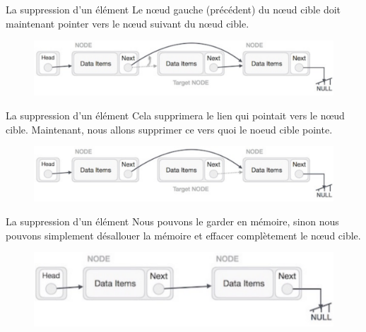 \documentclass[10pt,xcolor=dvipsnames]{beamer}
\begin{document}
\begin{frame}{La suppression d'un élément}
Le nœud gauche (précédent) du nœud cible doit maintenant pointer vers le nœud suivant du nœud cible.
        \begin{figure}
        \centering
        \includegraphics[scale=0.25]{figures/CM2/list-del-2.png}
        \label{fig:my_label}
    \end{figure}
    
\end{frame}

\begin{frame}{La suppression d'un élément}
Cela supprimera le lien qui pointait vers le nœud cible. Maintenant, nous allons supprimer ce vers quoi le noeud cible pointe.
        \begin{figure}
        \centering
        \includegraphics[scale=0.25]{figures/CM2/list-del-3.png}
        \label{fig:my_label}
    \end{figure}
    
\end{frame}

\begin{frame}{La suppression d'un élément}
 Nous pouvons le garder en mémoire, sinon nous pouvons simplement désallouer la mémoire et effacer complètement le nœud cible.
        \begin{figure}
        \centering
        \includegraphics[scale=0.25]{figures/CM2/list-del-4.png}
        \label{fig:my_label}
    \end{figure}
    
\end{frame}
\end{document}
